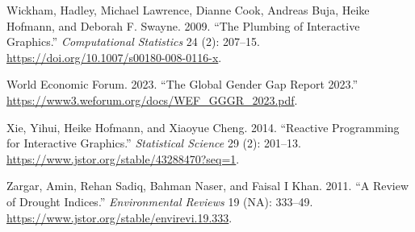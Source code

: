 \documentclass[
]{interact}
\newlength{\cslhangindent}
\newlength{\cslentryspacingunit} %
\newenvironment{CSLReferences}[2] %
 {%
  \setlength{\parindent}{0pt}
  \ifodd #1
  \let\oldpar\par
  \def\par{\hangindent=\cslhangindent\oldpar}
  \fi
  \setlength{\parskip}{#2\cslentryspacingunit}
 }%
 {}
\begin{document}
\begin{CSLReferences}{1}{0}
\leavevmode{}%
Wickham, Hadley, Michael Lawrence, Dianne Cook, Andreas Buja, Heike
Hofmann, and Deborah F. Swayne. 2009. {``The Plumbing of Interactive
Graphics.''} \emph{Computational Statistics} 24 (2): 207--15.
\url{https://doi.org/10.1007/s00180-008-0116-x}.

\leavevmode{}%
World Economic Forum. 2023. {``{The Global Gender Gap Report 2023}.''}
\url{https://www3.weforum.org/docs/WEF_GGGR_2023.pdf}.

\leavevmode{}%
Xie, Yihui, Heike Hofmann, and Xiaoyue Cheng. 2014. {``Reactive
{Programming} for {Interactive} {Graphics}.''} \emph{Statistical
Science} 29 (2): 201--13.
\url{https://www.jstor.org/stable/43288470?seq=1}.

\leavevmode{}%
Zargar, Amin, Rehan Sadiq, Bahman Naser, and Faisal I Khan. 2011. {``A
Review of Drought Indices.''} \emph{Environmental Reviews} 19 (NA):
333--49. \url{https://www.jstor.org/stable/envirevi.19.333}.

\end{CSLReferences}
\end{document}
